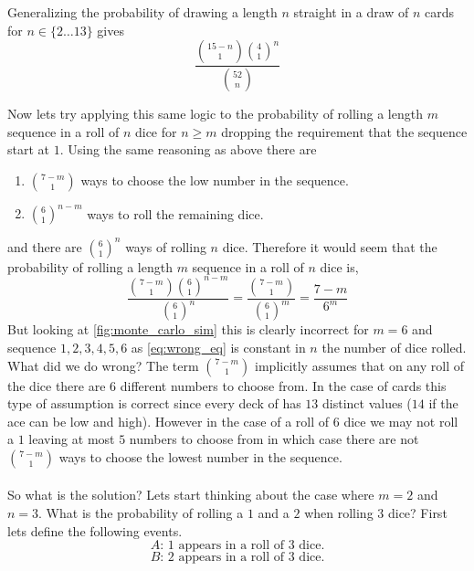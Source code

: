 \documentclass[12pt,a4paper]{article}
\begin{document}
Generalizing the probability of drawing a length $n$ straight in a draw of $n$ cards for $n\in\{2 \ldots 13\}$ gives
\begin{equation}
\frac{\binom{15-n}{1}\binom{4}{1}^n}{\binom{52}{n}}
\end{equation}

Now lets try applying this same logic to the probability of rolling a length $m$ sequence in a roll of $n$ dice for $n\geq m$ dropping the requirement that the sequence start at $1$. Using the same reasoning as above there are
\begin{enumerate}
\item $\binom{7-m}{1}$ ways to choose the low number in the sequence.
\item $\binom{6}{1}^{n-m}$ ways to roll the remaining dice.
\end{enumerate}
and there are $\binom{6}{1}^n$ ways of rolling $n$ dice. Therefore it would seem that the probability of rolling a length $m$ sequence in a roll of $n$ dice is,
\begin{equation}
\frac{\binom{7-m}{1}\binom{6}{1}^{n-m}}{\binom{6}{1}^n} = \frac{\binom{7-m}{1}}{\binom{6}{1}^m} = \frac{7-m}{6^m}
\label{eq:wrong_eq}
\end{equation}
But looking at \cref{fig:monte_carlo_sim} this is clearly incorrect for $m=6$ and sequence $1,2,3,4,5,6$ as \cref{eq:wrong_eq} is constant in $n$ the number of dice rolled.\\

What did we do wrong? The term $\binom{7-m}{1}$ implicitly assumes that on any roll of the dice there are $6$ different numbers to choose from. In the case of cards this type of assumption is correct since every deck of has $13$ distinct values ($14$ if the ace can be low and high). However in the case of a roll of $6$ dice we may not roll a $1$ leaving at most $5$ numbers to choose from in which case there are not $\binom{7-m}{1}$ ways to choose the lowest number in the sequence.\\

\hrulefill\\

So what is the solution? Lets start thinking about the case where $m=2$ and $n=3$. What is the probability of rolling a $1$ and a $2$ when rolling $3$ dice? First lets define the following events.
\begin{equation}
A \text{: 1 appears in a roll of 3 dice.}
\end{equation}
\begin{equation}
B \text{: 2 appears in a roll of 3 dice.}
\end{equation}
\end{document}
